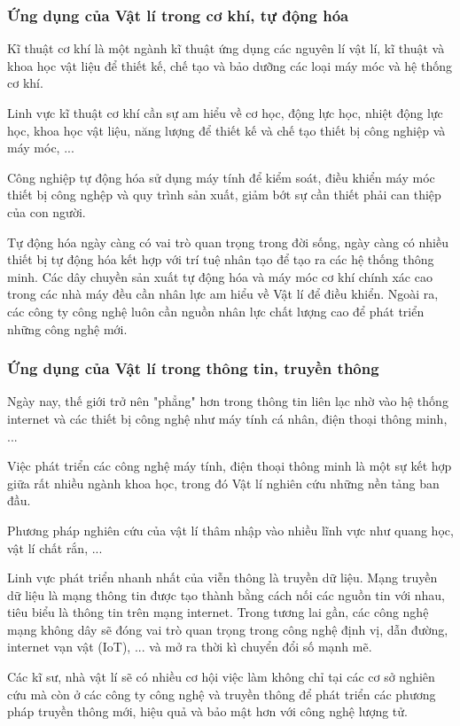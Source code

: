 \subsubsection{Ứng dụng của Vật lí trong cơ khí, tự động hóa}
Kĩ thuật cơ khí là một ngành kĩ thuật ứng dụng các nguyên lí vật lí, kĩ thuật và khoa học vật liệu để thiết kế, chế tạo và bảo dưỡng các loại máy móc và hệ thống cơ khí.

Linh vực kĩ thuật cơ khí cần sự am hiểu về cơ học, động lực học, nhiệt động lực học, khoa học vật liệu, năng lượng để thiết kế và chế tạo thiết bị công nghiệp và máy móc, ...

Công nghiệp tự động hóa sử dụng máy tính để kiểm soát, điều khiển máy móc thiết bị công nghệp và quy trình sản xuất, giảm bớt sự cần thiết phải can thiệp của con người.

Tự động hóa ngày càng có vai trò quan trọng trong đời sống, ngày càng có nhiều thiết bị tự động hóa kết hợp với trí tuệ nhân tạo để tạo ra các hệ thống thông minh.	 Các dây chuyền sản xuất tự động hóa và máy móc cơ khí chính xác cao trong các nhà máy đều cần nhân lực am hiểu về Vật lí để điều khiển. Ngoài ra, các công ty công nghệ luôn cần nguồn nhân lực chất lượng cao để phát triển những công nghệ mới.
\subsubsection{Ứng dụng của Vật lí trong thông tin, truyền thông}
Ngày nay, thế giới trở nên "phẳng" hơn trong thông tin liên lạc nhờ vào hệ thống internet và các thiết bị công nghệ như máy tính cá nhân, điện thoại thông minh, ...

Việc phát triển các công nghệ máy tính, điện thoại thông minh là một sự kết hợp giữa rất nhiều ngành khoa học, trong đó Vật lí nghiên cứu những nền tảng ban đầu.

Phương pháp nghiên cứu của vật lí thâm nhập vào nhiều lĩnh vực như quang học, vật lí chất rắn, ... 

Linh vực phát triển nhanh nhất của viễn thông là truyền dữ liệu. Mạng truyền dữ liệu là mạng thông tin được tạo thành bằng cách nối các nguồn tin với nhau, tiêu biểu là thông tin trên mạng internet. Trong tương lai gần, các công nghệ mạng không dây sẽ đóng vai trò quan trọng trong công nghệ định vị, dẫn đường, internet vạn vật (IoT), ... và mở ra thời kì chuyển đổi số mạnh mẽ.

Các kĩ sư, nhà vật lí sẽ có nhiều cơ hội việc làm không chỉ tại các cơ sở nghiên cứu mà còn ở các công ty công nghệ và truyền thông để phát triển các phương pháp truyền thông mới, hiệu quả và bảo mật hơn với công nghệ lượng tử.

